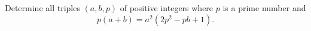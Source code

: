 Determine all triples $(a, b, p)$ of positive integers where $p$ is a prime number and
$$p(a+b) = a^2(2p^2 - pb + 1).$$
